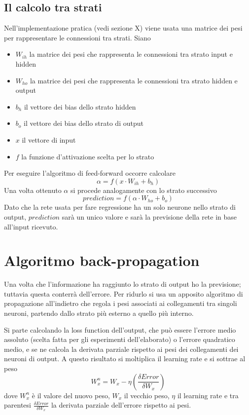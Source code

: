 \documentclass[12pt]{report}
\begin{document}
\subsection{Il calcolo tra strati}
Nell'implementazione pratica (vedi sezione X) viene usata una matrice dei pesi per rappresentare le connessioni tra strati. 
Siano 
\begin{itemize}
\item{$W_{ih}$} la matrice dei pesi che rappresenta le connessioni tra strato input e hidden
\item{$W_{ho}$} la matrice dei pesi che rappresenta le connessioni tra strato hidden e output
\item{$b_h$} il vettore dei bias dello strato hidden
\item{$b_o$} il vettore dei bias dello strato di output
\item{$x$} il vettore di input
\item{$f$} la funzione d'attivazione scelta per lo strato
\end{itemize}
Per eseguire l'algoritmo di feed-forward occorre calcolare
$$\alpha = f\left(x \cdot W_{ih} + b_h\right)$$
Una volta ottenuto $\alpha$ si procede analogamente con lo strato successivo
$$prediction = f\left(\alpha \cdot W_{ho} + b_o\right)$$
Dato che la rete usata per fare regressione ha un solo neurone nello strato di output, $prediction$ sarà un unico valore e sarà la previsione della rete in base all'input ricevuto.

\section{Algoritmo back-propagation}
Una volta che l’informazione ha raggiunto lo strato di output ho la previsione; tuttavia questa conterrà dell’errore. Per ridurlo si usa un apposito algoritmo di propagazione all’indietro che regola i pesi associati ai collegamenti tra singoli neuroni, partendo dallo strato più esterno a quello più interno.

Si parte calcolando la loss function dell’output, che può essere l’errore medio assoluto (scelta fatta per gli esperimenti dell'elaborato) o l’errore quadratico medio, e se ne calcola la derivata parziale rispetto ai pesi dei collegamenti dei neuroni di output. A questo risultato si moltiplica il learning rate e si sottrae al peso $$W^n_x = W_x - \eta \left(\frac{\delta Error}{\delta W_x}\right)$$ dove $W^n_x$ è il valore del nuovo peso, $W_x$ il vecchio peso, $\eta$ il learning rate e tra parentesi $\frac{\delta Error}{\delta W_x}$ la derivata parziale dell'errore rispetto ai pesi. 
\end{document}
